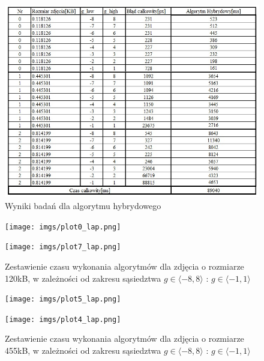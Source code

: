 \documentclass[document.tex]{subfiles}
\begin{document}
\begin{figure}[h]
\includegraphics[scale=0.75]{imgs/results_lap_hybrid.jpg}
\caption{Wyniki badań dla algorytmu hybrydowego}
\label{fig:results_lap_hybrid}
\end{figure}


\begin{figure}[h]
\texttt{[image: imgs/plot0\_lap.png]}
\caption*{}
\label{fig:results_lap_hybrid}
\end{figure}

\begin{figure}[h]
\texttt{[image: imgs/plot7\_lap.png]}
\caption{Zestawienie czasu wykonania algorytmów dla zdjęcia o rozmiarze 120kB, 
        w zależności od zakresu sąsiedztwa $g\in \langle -8, 8 \rangle$ : $g\in \langle -1, 1 \rangle$ }
\label{fig:results_lap_hybrid}
\end{figure}

\begin{figure}[h]
\texttt{[image: imgs/plot5\_lap.png]}
\caption*{}
\label{fig:results_lap_hybrid}
\end{figure}

\begin{figure}[h]
\texttt{[image: imgs/plot4\_lap.png]}
\caption{Zestawienie czasu wykonania algorytmów dla zdjęcia o rozmiarze 455kB, 
        w zależności od zakresu sąsiedztwa $g\in \langle -8, 8 \rangle$ : $g\in \langle -1, 1 \rangle$ }
\label{fig:results_lap_hybrid}
\end{figure}
\end{document}
